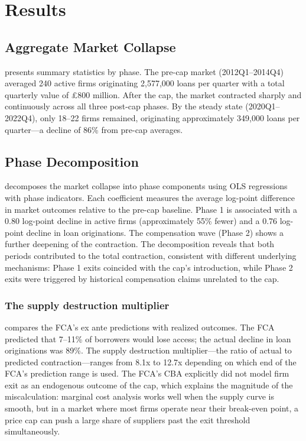 \documentclass[12pt]{article}
\begin{document}
\section{Results}

\subsection{Aggregate Market Collapse}

 presents summary statistics by phase. The pre-cap market (2012Q1--2014Q4) averaged 240 active firms originating 2,577,000 loans per quarter with a total quarterly value of \pounds800 million. After the cap, the market contracted sharply and continuously across all three post-cap phases. By the steady state (2020Q1--2022Q4), only 18--22 firms remained, originating approximately 349,000 loans per quarter---a decline of 86\% from pre-cap averages.



\subsection{Phase Decomposition}

 decomposes the market collapse into phase components using OLS regressions with phase indicators. Each coefficient measures the average log-point difference in market outcomes relative to the pre-cap baseline. Phase 1 is associated with a 0.80 log-point decline in active firms (approximately 55\% fewer) and a 0.76 log-point decline in loan originations. The compensation wave (Phase 2) shows a further deepening of the contraction. The decomposition reveals that both periods contributed to the total contraction, consistent with different underlying mechanisms: Phase 1 exits coincided with the cap's introduction, while Phase 2 exits were triggered by historical compensation claims unrelated to the cap.



\subsubsection*{The supply destruction multiplier}  compares the FCA's ex ante predictions with realized outcomes. The FCA predicted that 7--11\% of borrowers would lose access; the actual decline in loan originations was 89\%. The supply destruction multiplier---the ratio of actual to predicted contraction---ranges from 8.1x to 12.7x depending on which end of the FCA's prediction range is used. The FCA's CBA explicitly did not model firm exit as an endogenous outcome of the cap, which explains the magnitude of the miscalculation: marginal cost analysis works well when the supply curve is smooth, but in a market where most firms operate near their break-even point, a price cap can push a large share of suppliers past the exit threshold simultaneously.
\end{document}
